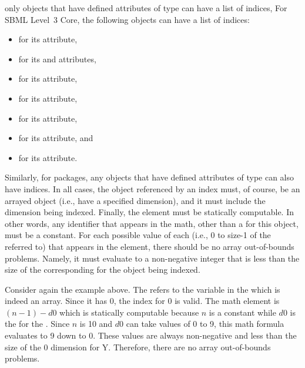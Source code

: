  only objects that have defined attributes of  type can have a list of indices,    For SBML Level~3 Core, the following objects can have a list of indices:
\begin{itemize}\setlength{\parskip}{-0.2ex}
\item \Model for its  attribute,
\item \Species for its  and  attributes,
\item \Reaction for its  attribute,
\item \InitialAssignment for its  attribute,
\item \Rule for its  attribute,
\item \SpeciesReference for its  attribute, and
\item \EventAssignment for its  attribute.
\end{itemize}
Similarly, for packages, any objects that have defined attributes of  type can also have indices.     In all cases, the object referenced by an index must, of course, be an arrayed object (i.e., have a specified dimension), and it must include the dimension being indexed.
Finally, the  element must be statically computable.   In other words, any identifier that appears in the math, other than a \Dimension {} for this object, must be a constant.   For each possible value of each \Dimension {}  (i.e., 0 to size-1 of the \Dimension referred to) that appears in the  element, there should be no array out-of-bounds problems.   Namely, it must evaluate to a non-negative integer that is less than the size of the corresponding \Dimension for the object being indexed.

Consider again the example above.   The \Index refers to the variable in the \AssignmentRule which is indeed an array.   Since it has  0, the index for  0 is valid.   The math element is $(n-1)  - d0$ which is statically computable because $n$ is a constant \Parameter while $d0$ is the \Dimension {} for the \AssignmentRule.   Since $n$ is 10 and $d0$ can take values of 0 to 9, this math formula evaluates to 9 down to 0.   These values are always non-negative and less than the size of the 0 dimension for Y.   Therefore, there are no array out-of-bounds problems.

